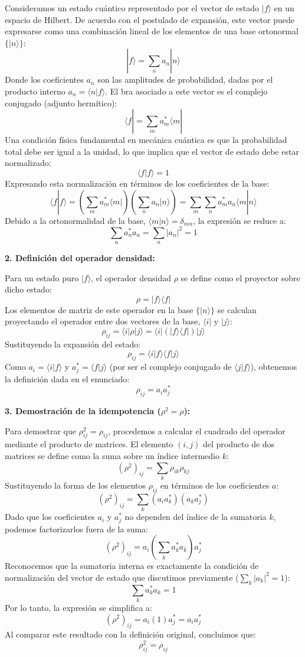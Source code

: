 \documentclass[a4paper]{article}
\begin{document}
Consideramos un estado cuántico representado por el vector de estado $|f\rangle$ en un espacio de Hilbert. De acuerdo con el postulado de expansión, este vector puede expresarse como una combinación lineal de los elementos de una base ortonormal $\{|n\rangle\}$:
$$ |f\rangle = \sum_n a_n |n\rangle $$
Donde los coeficientes $a_n$ son las amplitudes de probabilidad, dadas por el producto interno $a_n = \langle n|f\rangle$. El bra asociado a este vector es el complejo conjugado (adjunto hermítico):
$$ \langle f| = \sum_m a^*_m \langle m| $$
Una condición física fundamental en mecánica cuántica es que la probabilidad total debe ser igual a la unidad, lo que implica que el vector de estado debe estar normalizado:
$$ \langle f|f\rangle = 1 $$
Expresando esta normalización en términos de los coeficientes de la base:
$$ \langle f|f\rangle = \left( \sum_m a^*_m \langle m| \right) \left( \sum_n a_n |n\rangle \right) = \sum_m \sum_n a^*_m a_n \langle m|n\rangle $$
Debido a la ortonormalidad de la base, $\langle m|n\rangle = \delta_{mn}$, la expresión se reduce a:
$$ \sum_n a^*_n a_n = \sum_n |a_n|^2 = 1 $$

\textbf{2. Definición del operador densidad:}

Para un estado puro $|f\rangle$, el operador densidad $\rho$ se define como el proyector sobre dicho estado:
$$ \rho = |f\rangle\langle f| $$
Los elementos de matriz de este operador en la base $\{|n\rangle\}$ se calculan proyectando el operador entre dos vectores de la base, $\langle i|$ y $|j\rangle$:
$$ \rho_{ij} = \langle i|\rho|j\rangle = \langle i|(|f\rangle\langle f|)|j\rangle $$
Sustituyendo la expansión del estado:
$$ \rho_{ij} = \langle i|f\rangle \langle f|j\rangle $$
Como $a_i = \langle i|f\rangle$ y $a^*_j = \langle f|j\rangle$ (por ser el complejo conjugado de $\langle j|f\rangle$), obtenemos la definición dada en el enunciado:
$$ \rho_{ij} = a_i a^*_j $$

\textbf{3. Demostración de la idempotencia ($\rho^2 = \rho$):}

Para demostrar que $\rho^2_{ij} = \rho_{ij}$, procedemos a calcular el cuadrado del operador mediante el producto de matrices. El elemento $(i,j)$ del producto de dos matrices se define como la suma sobre un índice intermedio $k$:
$$ (\rho^2)_{ij} = \sum_k \rho_{ik} \rho_{kj} $$
Sustituyendo la forma de los elementos $\rho_{ij}$ en términos de los coeficientes $a$:
$$ (\rho^2)_{ij} = \sum_k (a_i a^*_k) (a_k a^*_j) $$
Dado que los coeficientes $a_i$ y $a^*_j$ no dependen del índice de la sumatoria $k$, podemos factorizarlos fuera de la suma:
$$ (\rho^2)_{ij} = a_i \left( \sum_k a^*_k a_k \right) a^*_j $$
Reconocemos que la sumatoria interna es exactamente la condición de normalización del vector de estado que discutimos previamente ($\sum_k |a_k|^2 = 1$):
$$ \sum_k a^*_k a_k = 1 $$
Por lo tanto, la expresión se simplifica a:
$$ (\rho^2)_{ij} = a_i (1) a^*_j = a_i a^*_j $$
Al comparar este resultado con la definición original, concluimos que:
$$ \rho^2_{ij} = \rho_{ij} $$
\end{document}
